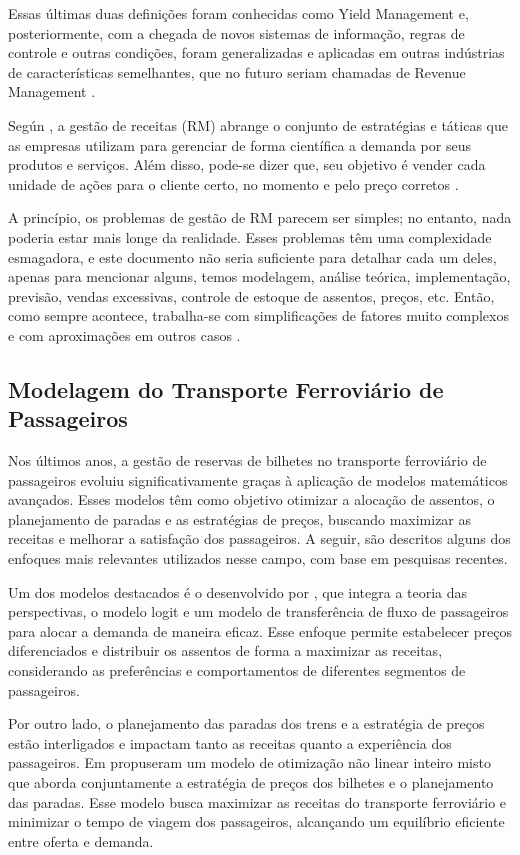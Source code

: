 Essas últimas duas definições foram conhecidas como Yield Management e, posteriormente, com a chegada de novos sistemas de informação, regras de controle e outras condições, foram generalizadas e aplicadas em outras indústrias de características semelhantes, que no futuro seriam chamadas de Revenue Management \cite{article_YM_to_RM}.

Según \cite{article_Ryzin2014}, a gestão de receitas (RM) abrange o conjunto de estratégias e táticas que as empresas utilizam para gerenciar de forma científica a demanda por seus produtos e serviços. Além disso, pode-se dizer que, seu objetivo é vender cada unidade de ações para o cliente certo, no momento e pelo preço corretos \cite{doi:10.1080/02642069.2010.491543}.

A princípio, os problemas de gestão de RM parecem ser simples; no entanto, nada poderia estar mais longe da realidade. Esses problemas têm uma complexidade esmagadora, e este documento não seria suficiente para detalhar cada um deles, apenas para mencionar alguns, temos modelagem, análise teórica, implementação, previsão, vendas excessivas, controle de estoque de assentos, preços, etc. Então, como sempre acontece, trabalha-se com simplificações de fatores muito complexos e com aproximações em outros casos \cite{doi:10.1287/trsc.33.2.233}.


\subsection{Modelagem do Transporte Ferroviário de Passageiros}
Nos últimos anos, a gestão de reservas de bilhetes no transporte ferroviário de passageiros evoluiu significativamente graças à aplicação de modelos matemáticos avançados. Esses modelos têm como objetivo otimizar a alocação de assentos, o planejamento de paradas e as estratégias de preços, buscando maximizar as receitas e melhorar a satisfação dos passageiros. A seguir, são descritos alguns dos enfoques mais relevantes utilizados nesse campo, com base em pesquisas recentes.

Um dos modelos destacados é o desenvolvido por \cite{zhou2023pricing}, que integra a teoria das perspectivas, o modelo logit e um modelo de transferência de fluxo de passageiros para alocar a demanda de maneira eficaz. Esse enfoque permite estabelecer preços diferenciados e distribuir os assentos de forma a maximizar as receitas, considerando as preferências e comportamentos de diferentes segmentos de passageiros.

Por outro lado, o planejamento das paradas dos trens e a estratégia de preços estão interligados e impactam tanto as receitas quanto a experiência dos passageiros. Em \cite{zhou2022nonlinear} propuseram um modelo de otimização não linear inteiro misto que aborda conjuntamente a estratégia de preços dos bilhetes e o planejamento das paradas. Esse modelo busca maximizar as receitas do transporte ferroviário e minimizar o tempo de viagem dos passageiros, alcançando um equilíbrio eficiente entre oferta e demanda.

